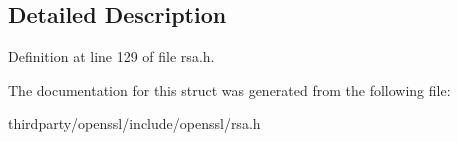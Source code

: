 \subsection{Detailed Description}


Definition at line 129 of file rsa.\+h.



The documentation for this struct was generated from the following file\+:\begin{DoxyCompactItemize}
\item 
thirdparty/openssl/include/openssl/rsa.\+h\end{DoxyCompactItemize}
